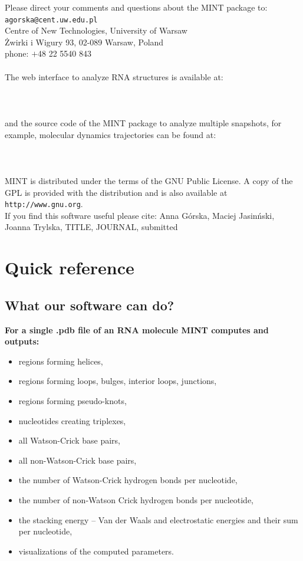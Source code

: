 \documentclass[12pt]{article}
\begin{document}
\noindent
Please direct your comments and questions about the MINT package to:\\
{\tt{agorska@cent.uw.edu.pl}}\\
Centre of New Technologies,
University of Warsaw\\
\.{Z}wirki i Wigury 93, 02-089 Warsaw, Poland\\
phone:  $+$48 22 5540 843 \\ 
\\
The web interface to analyze RNA structures is available at:\\
\\
{}\\
\\
\noindent
and the source code of the MINT package to analyze multiple snapshots, for example, molecular dynamics trajectories can be found at:\\
\\ 
{}\\
\\
MINT is distributed under the terms of the GNU Public License. 
A copy of the GPL is provided with the distribution and is also available at {\color{Blue}\tt{http://www.gnu.org}}. \\

\noindent
If you find this software useful please cite: Anna G\'{o}rska, Maciej Jasin\'{n}ski, Joanna Trylska, {\color{red}TITLE, JOURNAL, submitted}

\section{Quick reference}
\subsection{What our software can do?}

\textbf{For a single .pdb file of an RNA molecule MINT computes and outputs:}
\begin{itemize}
\item regions forming helices,
\item regions forming loops, bulges, interior loops, junctions,
\item regions forming pseudo-knots,
\item nucleotides creating triplexes,
\item all Watson-Crick base pairs,
\item all non-Watson-Crick base pairs,
\item the number of Watson-Crick hydrogen bonds per nucleotide,
\item the number of non-Watson Crick hydrogen bonds per nucleotide,
\item the stacking energy -- Van der Waals and electrostatic energies and their sum per nucleotide,
\item visualizations of the computed parameters.
\end{itemize}
\end{document}
